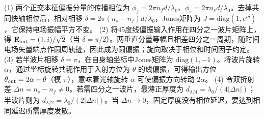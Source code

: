(1) 两个正交本征偏振分量的传播相位为 \(\phi_f=2\pi n_fd/\lambda_0\)、\(\phi_s=2\pi n_sd/\lambda_0\)。去掉共同快轴相位后，相对相移 \(\delta=2\pi(n_s-n_f)d/\lambda_0\)，Jones矩阵为 \(J=\mathrm{diag}(1,e^{i\delta})\)，它保持电场振幅平方不变。
(2) 将45度线偏振输入作用在四分之一波片矩阵上，得 \(\mathbf E_{\rm out}=(1,i)/\sqrt2\)（当 \(\delta=\pi/2\)）。两垂直分量等幅且相差四分之一周期，随时间电场矢量端点作圆周轨迹，因此成为圆偏振；旋向取决于相位和时间因子约定。
(3) 若半波片相移 \(\delta=\pi\)，在自身轴坐标中Jones矩阵为 \(\mathrm{diag}(1,-1)\)。将波片旋转 \(\alpha\)，通过坐标旋转共轭作用于入射方位为 \(\theta\) 的线偏振，可得输出方位 \(\theta_{\rm out}=2\alpha-\theta\)（模 \(\pi\)），意味着光轴旋转 \(\alpha\) 可使偏振方向转动 \(2\alpha\)。
(4) 令双折射差 \(\Delta n=n_s-n_f\ne0\)。若需四分之一波片，最薄正厚度为 \(d_{\lambda/4}=\lambda_0/(4|\Delta n|)\)；半波片则为 \(d_{\lambda/2}=\lambda_0/(2|\Delta n|)\)。当 \(\Delta n\to0\)，固定厚度没有相位延迟，要达到相同延迟所需厚度发散。
